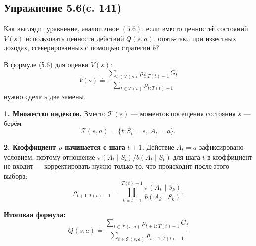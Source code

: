 \subsection{Упражнение 5.6(c. 141)}
Как выглядит уравнение, аналогичное $(5.6)$, если вместо ценностей состояний $V(s)$ использовать ценности действий $Q(s, a)$, опять-таки при известных доходах, сгенерированных с помощью стратегии $b$?
\begin{solution}
    В формуле (5.6) для оценки $V(s)$:
    \[
    V(s) \doteq \frac{\sum_{t \in \mathcal{T}(s)} \rho_{t:T(t)-1}\, G_t}{\sum_{t \in \mathcal{T}(s)} \rho_{t:T(t)-1}}
    \]
    нужно сделать две замены.

    \textbf{1. Множество индексов.} Вместо $\mathcal{T}(s)$ — моментов посещения состояния $s$ — берём
    \[
    \mathcal{T}(s,a) = \{t : S_t = s,\ A_t = a\}.
    \]

    \textbf{2. Коэффициент $\rho$ начинается с шага $t+1$.} Действие $A_t = a$
    зафиксировано условием, поэтому отношение $\pi(A_t \mid S_t) / b(A_t \mid S_t)$
    для шага $t$ в коэффициент не входит — корректировать нужно только то, что
    происходит после этого выбора:
    \[
    \rho_{t+1:T(t)-1} = \prod_{k=t+1}^{T(t)-1} \frac{\pi(A_k \mid S_k)}{b(A_k \mid S_k)}.
    \]

    \textbf{Итоговая формула:}
    \[
    \boxed{\,Q(s,a) \doteq \frac{\sum_{t \in \mathcal{T}(s,a)} \rho_{t+1:T(t)-1}\, G_t}{\sum_{t \in \mathcal{T}(s,a)} \rho_{t+1:T(t)-1}}\,}
    \]
\end{solution}

